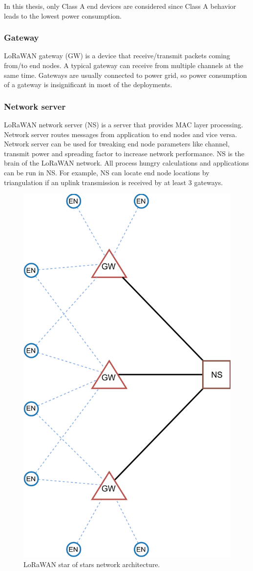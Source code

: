 In this thesis, only Class A end devices are considered since Class A behavior leads to the lowest power consumption.

\subsubsection{Gateway}

LoRaWAN gateway (GW) is a device that receive/transmit packets coming from/to end nodes. A typical gateway can receive from multiple channels at the same time. Gateways are usually connected to power grid, so power consumption of a gateway is insignificant in most of the deployments.

\subsubsection{Network server}

LoRaWAN network server (NS) is a server that provides MAC layer processing. Network server routes messages from application to end nodes and vice versa. Network server can be used for tweaking end node parameters like channel, transmit power and spreading factor to increase network performance. NS is the brain of the LoRaWAN network. All process hungry calculations and applications can be run in NS. For example, NS can locate end node locations by triangulation if an uplink transmission is received by at least 3 gateways.

\begin{figure}
\centering
\includegraphics[width=.7\linewidth]{fig/lorawan_topology.png}
\vspace*{4mm}
\caption{LoRaWAN star of stars network architecture.}
\label{fig:lorawan_topology}
\end{figure}

